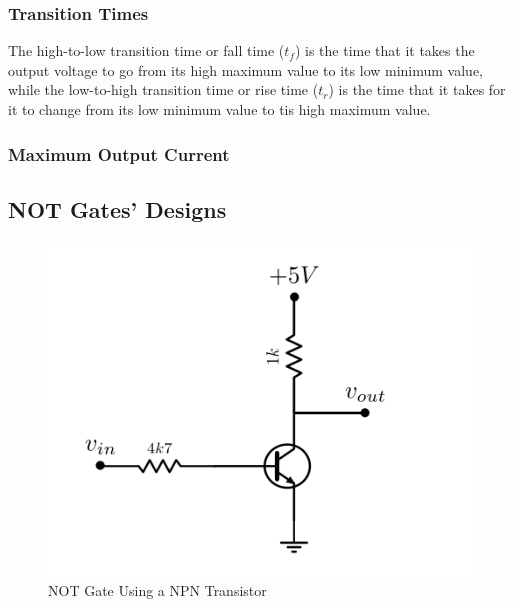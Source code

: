 \documentclass[a4paper,11pt]{report}
\begin{document}
\subsubsection{\color{red}Transition Times}
The high-to-low transition time or fall time ($t_{f}$) is the time that it takes the output voltage to go from its high maximum value to its low minimum value, while the low-to-high transition time or rise time ($t_{r}$) is the time that it takes for it to change from its low minimum value to tis high maximum value.


\subsubsection {\color{red}Maximum Output Current}

\subsection{\color{purple}NOT Gates' Designs}

\begin{figure}[h!]
\centering
\includegraphics[scale=1]{../Exercise1/circuitoNPN}
\caption{NOT Gate Using a NPN Transistor}
\label{circNPN}
\end{figure}
\end{document}
